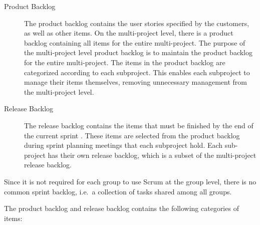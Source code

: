 \begin{description}
  \item[Product Backlog] The product backlog contains the user stories specified by the customers, as well as other items. On the multi-project level, there is a product backlog containing all items for the entire multi-project. The purpose of the multi-project level product backlog is to maintain the product backlog for the entire multi-project. The items in the product backlog are categorized according to each subproject. This enables each subproject to manage their items themselves, removing unnecessary management from the multi-project level.
  \item[Release Backlog] The release backlog contains the items that must be finished by the end of the current sprint \parencite{larman2003}. These items are selected from the product backlog during sprint planning meetings that each subproject hold. Each sub-project has their own release backlog, which is a subset of the multi-project release backlog.
\end{description}

Since it is not required for each group to use Scrum at the group level, there is no common sprint backlog, i.e.\ a collection of tasks shared among all groups.

The product backlog and release backlog contains the following categories of items:

